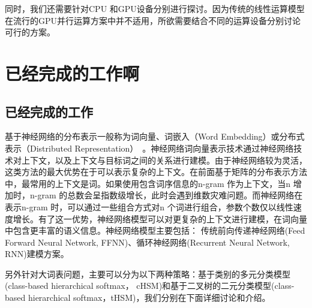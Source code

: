 \documentclass[master,openright,twoside,color]{buaathesis}
\begin{document}
同时，我们还需要针对CPU 和GPU设备分别进行探讨。因为传统的线性运算模型在流行的GPU并行运算方案中并不适用，所欲需要结合不同的运算设备分别讨论可行的方案。



\chapter{已经完成的工作啊}

\section{已经完成的工作}
基于神经网络的分布表示一般称为词向量、词嵌入（Word Embedding）或分布式表示（Distributed Representation）~\cite{DBLP:conf/nips/MikolovSCCD13}。神经网络词向量表示技术通过神经网络技术对上下文，以及上下文与目标词之间的关系进行建模。由于神经网络较为灵活，这类方法的最大优势在于可以表示复杂的上下文。在前面基于矩阵的分布表示方法中，最常用的上下文是词。如果使用包含词序信息的n-gram 作为上下文，当n 增加时，n-gram 的总数会呈指数级增长，此时会遇到维数灾难问题。而神经网络在表示n-gram 时，可以通过一些组合方式对n 个词进行组合，参数个数仅以线性速度增长。有了这一优势，神经网络模型可以对更复杂的上下文进行建模，在词向量中包含更丰富的语义信息。神经网络模型主要包括： 传统前向传递神经网络(Feed Forward Neural Network, FFNN)、循环神经网络(Recurrent Neural Network, RNN)建模方案。

另外针对大词表问题，主要可以分为以下两种策略：基于类别的多元分类模型(class-based hierarchical softmax， cHSM)和基于二叉树的二元分类模型(class-based hierarchical softmax，tHSM)，我们分别在下面详细讨论和介绍。
\end{document}
